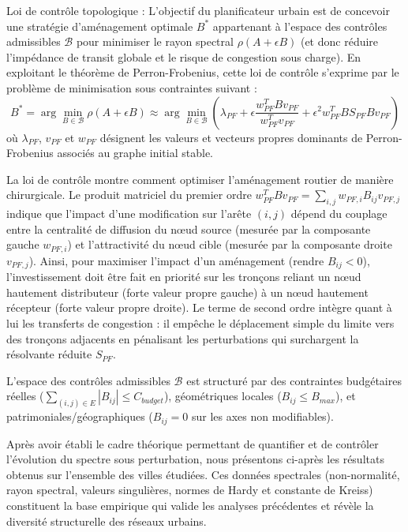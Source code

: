 \documentclass[10pt, a4paper]{article}
\begin{document}
Loi de contrôle topologique : L'objectif du planificateur urbain est de
concevoir une stratégie d'aménagement optimale \(B^*\) appartenant à
l'espace des contrôles admissibles \(\mathcal{B}\) pour minimiser le
rayon spectral \(\rho(A + \epsilon B)\) (et donc réduire l'impédance de
transit globale et le risque de congestion sous charge). En exploitant
le théorème de Perron-Frobenius, cette loi de contrôle s'exprime par le
problème de minimisation sous contraintes suivant :
\[B^* = \arg\min_{B \in \mathcal{B}} \rho(A + \epsilon B) \approx \arg\min_{B \in \mathcal{B}} \left( \lambda_{PF} + \epsilon \frac{w_{PF}^T B v_{PF}}{w_{PF}^T v_{PF}} + \epsilon^2 w_{PF}^T B S_{PF} B v_{PF} \right)\]
où \(\lambda_{PF}\), \(v_{PF}\) et \(w_{PF}\) désignent les valeurs et
vecteurs propres dominants de Perron-Frobenius associés au graphe
initial stable.

La loi de contrôle montre comment optimiser l'aménagement routier de
manière chirurgicale. Le produit matriciel du premier ordre
\(w_{PF}^T B v_{PF} = \sum_{i,j} w_{PF, i} B_{ij} v_{PF, j}\) indique
que l'impact d'une modification sur l'arête \((i, j)\) dépend du
couplage entre la centralité de diffusion du nœud source (mesurée par la
composante gauche \(w_{PF, i}\)) et l'attractivité du nœud cible
(mesurée par la composante droite \(v_{PF, j}\)). Ainsi, pour maximiser
l'impact d'un aménagement (rendre \(B_{ij} < 0\)), l'investissement doit
être fait en priorité sur les tronçons reliant un nœud hautement
distributeur (forte valeur propre gauche) à un nœud hautement récepteur
(forte valeur propre droite). Le terme de second ordre intègre quant à
lui les transferts de congestion : il empêche le déplacement simple du
limite vers des tronçons adjacents en pénalisant les perturbations qui
surchargent la résolvante réduite \(S_{PF}\).

L'espace des contrôles admissibles \(\mathcal{B}\) est structuré par des
contraintes budgétaires réelles
(\(\sum_{(i,j) \in E} |B_{ij}| \le C_{budget}\)), géométriques locales
(\(B_{ij} \le B_{max}\)), et patrimoniales/géographiques (\(B_{ij} = 0\)
sur les axes non modifiables).

Après avoir établi le cadre théorique permettant de quantifier et de
contrôler l'évolution du spectre sous perturbation, nous présentons
ci-après les résultats obtenus sur l'ensemble des villes étudiées. Ces
données spectrales (non-normalité, rayon spectral, valeurs singulières,
normes de Hardy et constante de Kreiss) constituent la base empirique
qui valide les analyses précédentes et révèle la diversité structurelle
des réseaux urbains.
\end{document}
